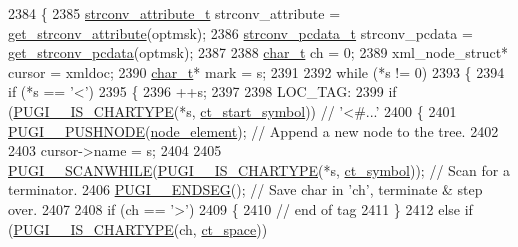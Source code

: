 \begin{DoxyCode}
2384         \{
2385             \hyperlink{pugixml_8cpp_ab7ee7f946a7c5e9821fab22ef05fc0ed}{strconv\_attribute\_t} strconv\_attribute = 
      \hyperlink{pugixml_8cpp_a2ea43b65ff9cfdf86459c60a1a0849ec}{get\_strconv\_attribute}(optmsk);
2386             \hyperlink{pugixml_8cpp_aafccd3afb496514b0e76d81164955c28}{strconv\_pcdata\_t} strconv\_pcdata = \hyperlink{pugixml_8cpp_a2f80cbdc79c199f54f617b8c42a37bec}{get\_strconv\_pcdata}(optmsk);
2387             
2388             \hyperlink{namespacepugi_aef5a7a62cba0507542220ea15afe39df}{char\_t} ch = 0;
2389             xml\_node\_struct* cursor = xmldoc;
2390             \hyperlink{namespacepugi_aef5a7a62cba0507542220ea15afe39df}{char\_t}* mark = s;
2391 
2392             \textcolor{keywordflow}{while} (*s != 0)
2393             \{
2394                 \textcolor{keywordflow}{if} (*s == \textcolor{charliteral}{'<'})
2395                 \{
2396                     ++s;
2397 
2398                 LOC\_TAG:
2399                     \textcolor{keywordflow}{if} (\hyperlink{pugixml_8cpp_a2adf5ae9b7505408a18e9f3bb1b3d332}{PUGI\_\_IS\_CHARTYPE}(*s, \hyperlink{pugixml_8cpp_ae83a55e5947d28c62625b690b1484108a25a043d6a8b5a269b3cd8f512d712798}{ct\_start\_symbol})) \textcolor{comment}{// '<#...'}
2400                     \{
2401                         \hyperlink{pugixml_8cpp_accdd212cd2831662c3c2dda668246f8a}{PUGI\_\_PUSHNODE}(\hyperlink{namespacepugi_a137e94a038e4ab0ada6477cf7f6153a9a6d223e3a0d8ce8e4ee6f4a2697b8bcd1}{node\_element}); \textcolor{comment}{// Append a new node to the
       tree.}
2402 
2403                         cursor->name = s;
2404 
2405                         \hyperlink{pugixml_8cpp_adfcdc54e9f7e0f2d3927b4a7690abf2a}{PUGI\_\_SCANWHILE}(\hyperlink{pugixml_8cpp_a2adf5ae9b7505408a18e9f3bb1b3d332}{PUGI\_\_IS\_CHARTYPE}(*s, 
      \hyperlink{pugixml_8cpp_ae83a55e5947d28c62625b690b1484108af8e561bd4654ab93d82193fdd3727915}{ct\_symbol})); \textcolor{comment}{// Scan for a terminator.}
2406                         \hyperlink{pugixml_8cpp_a39554337dd1d0fef32ddf9926ee4e4ae}{PUGI\_\_ENDSEG}(); \textcolor{comment}{// Save char in 'ch', terminate & step over.}
2407 
2408                         \textcolor{keywordflow}{if} (ch == \textcolor{charliteral}{'>'})
2409                         \{
2410                             \textcolor{comment}{// end of tag}
2411                         \}
2412                         \textcolor{keywordflow}{else} \textcolor{keywordflow}{if} (\hyperlink{pugixml_8cpp_a2adf5ae9b7505408a18e9f3bb1b3d332}{PUGI\_\_IS\_CHARTYPE}(ch, \hyperlink{pugixml_8cpp_ae83a55e5947d28c62625b690b1484108ac957a1774b6a4430e583bcb881909372}{ct\_space}))

\end{DoxyCode}
